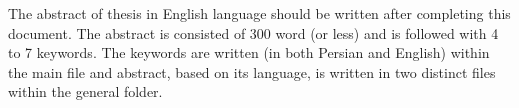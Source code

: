 
The abstract of thesis in English language should be written after completing this document. The abstract is consisted of 300 word (or less) and is followed with 4 to 7 keywords. The keywords are written (in both Persian and English) within the main file and abstract, based on its language, is written in two distinct files within the general folder.
